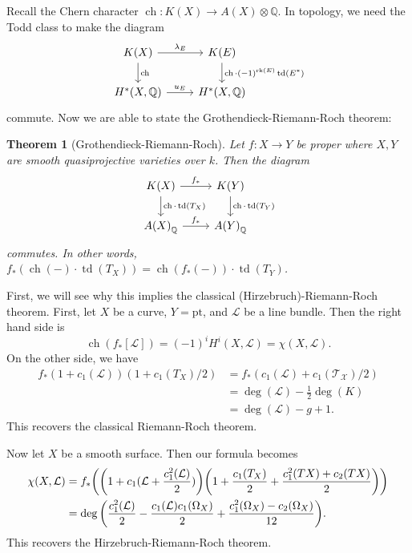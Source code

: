 \documentclass[leqno, openany]{memoir}
\newtheorem{thm}{Theorem}[section]
\theoremstyle{definition}
\theoremstyle{remark}
\theoremstyle{plain}
\theoremstyle{definition}
\theoremstyle{remark}
\newcommand{\Q}{\mathbb{Q}}
\newcommand{\mc}[1]{\mathcal{#1}}
\newcommand{\mr}[1]{\mathrm{#1}}
\DeclareMathOperator{\ch}{ch}
\DeclareMathOperator{\td}{td}
\begin{document}
Recall the Chern character $\ch \colon K(X) \to A(X) \otimes \Q$. In topology, we need the Todd class to make the diagram
\begin{equation*}
\begin{tikzcd}
    K(X) \ar{r}{\lambda_E} \ar{d}{\ch} & K(E) \ar{d}{\ch \cdot {(-1)}^{\mr{rk}(E)} \td(E^*)} \\
    H^*(X, \Q) \ar{r}{u_E} & H^*(X, \Q)
\end{tikzcd}
\end{equation*}
commute. Now we are able to state the Grothendieck-Riemann-Roch theorem:

\begin{thm}[Grothendieck-Riemann-Roch]
    Let $f \colon X \to Y$ be proper where $X, Y$ are smooth quasiprojective varieties over $k$. Then the diagram
    \begin{equation*}
    \begin{tikzcd}
        K(X) \ar{r}{f_*} \ar{d}{\ch \cdot \td(T_X)} & K(Y) \ar{d}{\ch \cdot \td(T_Y)} \\
        {A(X)}_{\Q} \ar{r}{f_*} & {A(Y)}_{\Q}
    \end{tikzcd}
    \end{equation*}
    commutes. In other words, $f_*(\ch(-) \cdot \td(T_X)) = \ch(f_*(-)) \cdot \td(T_Y)$.
\end{thm}

First, we will see why this implies the classical (Hirzebruch)-Riemann-Roch theorem. First, let $X$ be a curve, $Y = \mr{pt}$, and $\mc{L}$ be a line bundle. Then the right hand side is 
\[ \ch(f_* [\mc{L}]) = {(-1)}^i H^i(X, \mc{L}) = \chi(X, \mc{L}). \]
On the other side, we have
\begin{align*}
    f_* (1 + c_1(\mc{L})) ( 1 + c_1(T_X)/2 ) &= f_*(c_1(\mc{L}) + c_1(\mc{T_X})/2) \\
                                              &= \deg(\mc{L}) - \frac{1}{2} \deg(K) \\
                                              &= \deg(\mc{L}) - g + 1.
\end{align*}
This recovers the classical Riemann-Roch theorem.

Now let $X$ be a smooth surface. Then our formula becomes
\begin{align*}
    \chi(X, \mc{L}) &= f_* \qty( \qty(1 + c_1(\mc{L} + \frac{c_1^2(\mc{L})}{2})) \qty(1 + \frac{c_1(T_X)}{2} + \frac{c_1^2(TX) + c_2(TX)}{2}) ) \\
                     &= \deg \qty( \frac{c_1^2(\mc{L})}{2} - \frac{c_1(\mc{L}) c_1(\Omega_X)}{2} + \frac{c_1^2(\Omega_X) - c_2(\Omega_X)}{12} ). 
\end{align*} 
This recovers the Hirzebruch-Riemann-Roch theorem.
\end{document}

